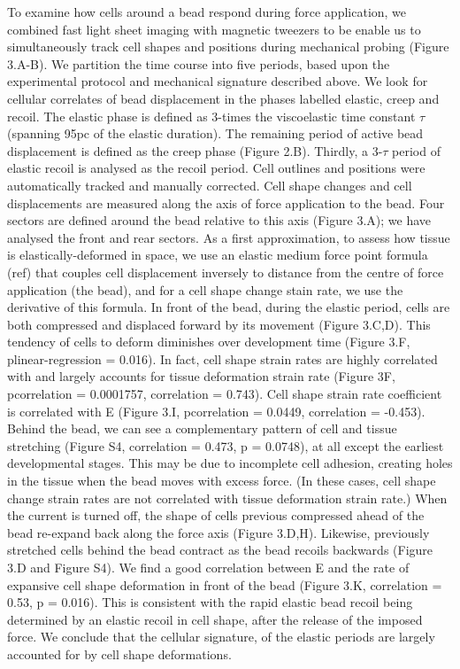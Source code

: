 To examine how cells around a bead respond during force application, we combined fast light sheet imaging with magnetic tweezers to be enable us to simultaneously track cell shapes and positions during mechanical probing (Figure 3.A-B).
We partition the time course into five periods, based upon the experimental protocol and mechanical signature described above. We look for cellular correlates of bead displacement in the phases labelled elastic, creep and recoil.
The elastic phase is defined as 3-times the viscoelastic time constant $\tau$ (spanning 95pc of the elastic duration).
The remaining period of active bead displacement is defined as the creep phase (Figure 2.B).
Thirdly, a 3-$\tau$ period of elastic recoil is analysed as the recoil period.
Cell outlines and positions were automatically tracked and manually corrected.
Cell shape changes and cell displacements are measured along the axis of force application to the bead.
Four sectors are defined around the bead relative to this axis (Figure 3.A); we have analysed the front and rear sectors.
As a first approximation, to assess how tissue is elastically-deformed in space, we use an elastic medium force point formula (ref) that couples cell displacement inversely to distance from the centre of force application (the bead), and for a cell shape change stain rate, we use the derivative of this formula.
In front of the bead, during the elastic period, cells are both compressed and displaced forward by its movement (Figure 3.C,D).
This tendency of cells to deform diminishes over development time (Figure 3.F, plinear-regression = 0.016).
In fact, cell shape strain rates are highly correlated with and largely accounts for tissue deformation strain rate (Figure 3F, pcorrelation = 0.0001757, correlation = 0.743).
Cell shape strain rate coefficient is correlated with E (Figure 3.I, pcorrelation = 0.0449, correlation = -0.453).
Behind the bead, we can see a complementary pattern of cell and tissue stretching (Figure S4, correlation = 0.473, p = 0.0748), at all except the earliest developmental stages.
This may be due to incomplete cell adhesion, creating holes in the tissue when the bead moves with excess force. (In these cases, cell shape change strain rates are not correlated with tissue deformation strain rate.)
When the current is turned off, the shape of cells previous compressed ahead of the bead re-expand back along the force axis (Figure 3.D,H).
Likewise, previously stretched cells behind the bead contract as the bead recoils backwards (Figure 3.D and Figure S4).
We find a good correlation between E and the rate of expansive cell shape deformation in front of the bead (Figure 3.K, correlation = 0.53, p = 0.016).
This is consistent with the rapid elastic bead recoil being determined by an elastic recoil in cell shape, after the release of the imposed force.
We conclude that the cellular signature, of the elastic periods are largely accounted for by cell shape deformations.

